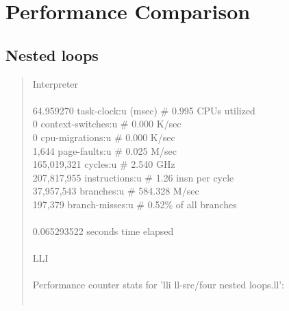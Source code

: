 \documentclass[12pt]{report}
\begin{document}
\section*{Performance Comparison}
\subsection*{Nested loops}
\begin{quote}
 Interpreter \\ 
                                                                                      \\ 
         64.959270      task-clock:u (msec)       \#    0.995 CPUs utilized           \\ 
                 0      context-switches:u        \#    0.000 K/sec                   \\ 
                 0      cpu-migrations:u          \#    0.000 K/sec                   \\ 
             1,644      page-faults:u             \#    0.025 M/sec                   \\ 
       165,019,321      cycles:u                  \#    2.540 GHz                     \\ 
       207,817,955      instructions:u            \#    1.26  insn per cycle          \\ 
        37,957,543      branches:u                \#  584.328 M/sec                   \\ 
           197,379      branch-misses:u           \#    0.52\% of all branches        \\ 
                                                                                      \\ 
       0.065293522 seconds time elapsed                                               \\ 
                                                                                      \\ 
LLI                                                                                     \\ 
                                                                                      \\ 
 Performance counter stats for 'lli ll-src/four nested loops.ll':                     \\ 
                                                                                      \\ 

\end{quote}
\end{document}
